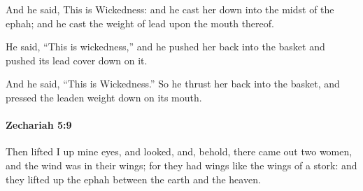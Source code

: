 			\begin{versebox}
					\item[BHS] 
					\item[LXX] 
					\item[ASV] And he said, This is Wickedness: and he cast her down into the midst of the ephah; and he cast the weight of lead upon the mouth thereof.
					\item[NIV] He said, “This is wickedness,” and he pushed her back into the basket and pushed its lead cover down on it.
					\item[NRSV] And he said, “This is Wickedness.” So he thrust her back into the basket, and pressed the leaden weight down on its mouth.
			\end{versebox}

		\paragraph{Zechariah 5:9} %
			\label{ZECHARIAH-5-9}

			Then lifted I up mine eyes, and looked, and, behold, there came out two women, and the wind was in their wings; for they had wings like the wings of a stork: and they lifted up the ephah between the earth and the heaven.

